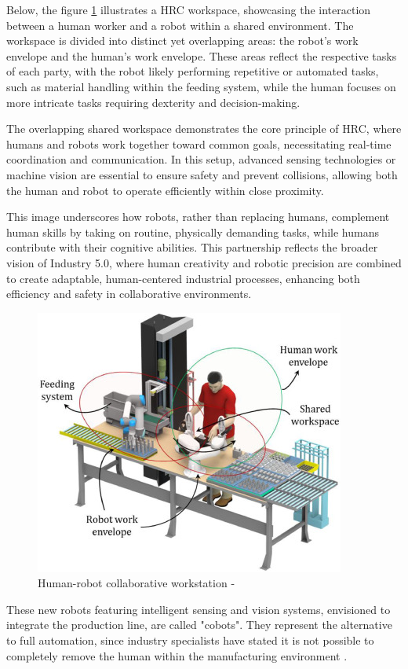 Below, the figure \ref{fig:hrc-workstation} illustrates a \ac{HRC} workspace, showcasing the interaction between a human worker and a robot within a shared environment. The workspace is divided into distinct yet overlapping areas: the robot's work envelope and the human's work envelope. These areas reflect the respective tasks of each party, with the robot likely performing repetitive or automated tasks, such as material handling within the feeding system, while the human focuses on more intricate tasks requiring dexterity and decision-making.

The overlapping shared workspace demonstrates the core principle of \ac{HRC}, where humans and robots work together toward common goals, necessitating real-time coordination and communication. In this setup, advanced sensing technologies or machine vision are essential to ensure safety and prevent collisions, allowing both the human and robot to operate efficiently within close proximity.

This image underscores how robots, rather than replacing humans, complement human skills by taking on routine, physically demanding tasks, while humans contribute with their cognitive abilities. This partnership reflects the broader vision of Industry 5.0, where human creativity and robotic precision are combined to create adaptable, human-centered industrial processes, enhancing both efficiency and safety in collaborative environments.

\begin{figure}[!htbp]
    \centering
    \includegraphics[width=0.55\linewidth]{figs/human-robot-collab-env.jpg}
    \caption{Human-robot collaborative workstation - \cite{MALIK2021102092}} 
    \label{fig:hrc-workstation}
\end{figure} 


These new robots featuring intelligent sensing and vision systems, envisioned to integrate the production line, are called "cobots". 
They represent the alternative to full automation, since industry specialists have stated it is not possible to completely remove the 
human within the manufacturing environment \cite{Weiss2021}.

